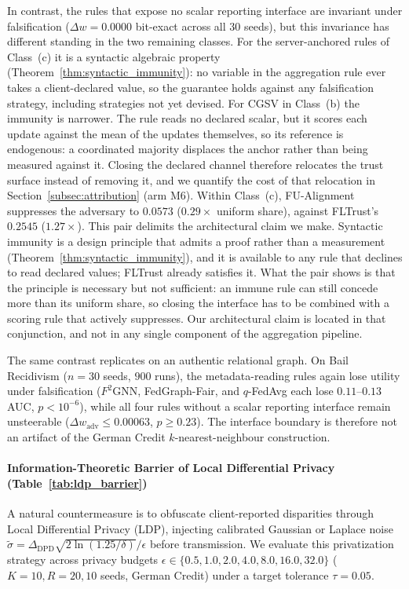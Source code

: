 In contrast, the rules that expose no scalar reporting interface are invariant under falsification ($\Delta w = 0.0000$ bit-exact across all 30 seeds), but this invariance has different standing in the two remaining classes. For the server-anchored rules of Class~(c) it is a syntactic algebraic property (Theorem~\ref{thm:syntactic_immunity}): no variable in the aggregation rule ever takes a client-declared value, so the guarantee holds against any falsification strategy, including strategies not yet devised. For CGSV in Class~(b) the immunity is narrower. The rule reads no declared scalar, but it scores each update against the mean of the updates themselves, so its reference is endogenous: a coordinated majority displaces the anchor rather than being measured against it. Closing the declared channel therefore relocates the trust surface instead of removing it, and we quantify the cost of that relocation in Section~\ref{subsec:attribution} (arm M6). Within Class~(c), FU-Alignment suppresses the adversary to $0.0573$ ($0.29\times$ uniform share), against FLTrust's $0.2545$ ($1.27\times$). This pair delimits the architectural claim we make. Syntactic immunity is a design principle that admits a proof rather than a measurement (Theorem~\ref{thm:syntactic_immunity}), and it is available to any rule that declines to read declared values; FLTrust already satisfies it. What the pair shows is that the principle is necessary but not sufficient: an immune rule can still concede more than its uniform share, so closing the interface has to be combined with a scoring rule that actively suppresses. Our architectural claim is located in that conjunction, and not in any single component of the aggregation pipeline.

The same contrast replicates on an authentic relational graph. On Bail Recidivism ($n = 30$ seeds, $900$ runs), the metadata-reading rules again lose utility under falsification ($F^2$GNN, FedGraph-Fair, and $q$-FedAvg each lose $0.11$--$0.13$ AUC, $p < 10^{-6}$), while all four rules without a scalar reporting interface remain unsteerable ($\Delta w_{\mathrm{adv}} \le 0.00063$, $p \ge 0.23$). The interface boundary is therefore not an artifact of the German Credit $k$-nearest-neighbour construction.



\paragraph{Information-Theoretic Barrier of Local Differential Privacy (Table~\ref{tab:ldp_barrier})}
A natural countermeasure is to obfuscate client-reported disparities through Local Differential Privacy (LDP), injecting calibrated Gaussian or Laplace noise $\tilde{\sigma} = \Delta_{\text{DPD}} \sqrt{2 \ln(1.25/\delta)} / \epsilon$ before transmission. We evaluate this privatization strategy across privacy budgets $\epsilon \in \{0.5, 1.0, 2.0, 4.0, 8.0, 16.0, 32.0\}$ ($K=10, R=20, 10$ seeds, German Credit) under a target tolerance $\tau = 0.05$.

